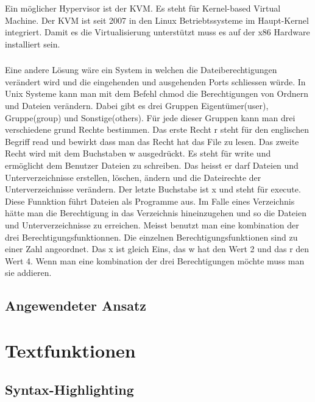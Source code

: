 \documentclass[10pt]{article}
\begin{document}
	Ein möglicher Hypervisor ist der KVM. Es steht für Kernel-based Virtual Machine. Der KVM ist seit 2007 in den Linux Betriebtssysteme im Haupt-Kernel integriert.%
	Damit es die Virtualisierung unterstützt muss es auf der x86 Hardware installiert sein.
	
	
	\subsubsection{}
	Eine andere Lösung wäre ein System in welchen die Dateiberechtigungen verändert wird und die eingehenden und ausgehenden Ports schliessen würde. In Unix Systeme kann man mit dem Befehl chmod die Berechtigungen von Ordnern und Dateien verändern. Dabei gibt es drei Gruppen Eigentümer(user), Gruppe(group) und Sonstige(others). Für jede dieser Gruppen kann man drei verschiedene grund Rechte bestimmen. Das erste Recht r steht für den englischen Begriff read und bewirkt dass man das Recht hat das File zu lesen. Das zweite Recht wird mit dem Buchstaben w ausgedrückt. Es steht für write und ermöglicht dem Benutzer Dateien zu schreiben. Das heisst er darf Dateien und Unterverzeichnisse erstellen, löschen, ändern und die Dateirechte der Unterverzeichnisse verändern. Der letzte Buchstabe ist x und steht für execute. Diese Funnktion führt Dateien als Programme aus. Im Falle eines Verzeichnis hätte man die Berechtigung in das Verzeichnis hineinzugehen und so die Dateien und Unterverzeichnisse zu erreichen. Meisst benutzt man eine kombination der drei Berechtigungsfunktionnen. Die einzelnen Berechtigungsfunktionen sind zu einer Zahl angeordnet. Das x ist gleich Eins, das w hat den Wert 2 und das r den Wert 4. Wenn man eine kombination der drei Berechtigungen möchte muss man sie addieren.
	
	\pagebreak
	\subsection{Angewendeter Ansatz}
	
	\pagebreak
	\section{Textfunktionen}
	\subsection{Syntax-Highlighting}
\end{document}
